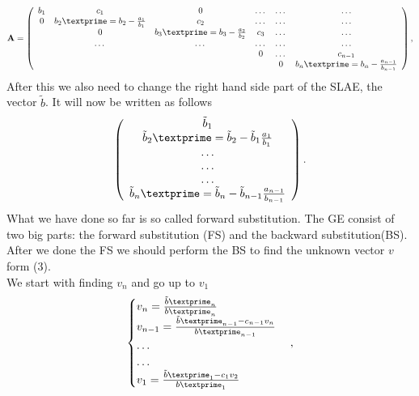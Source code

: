 \documentclass[10pt]{article}
\begin{document}
\begin{equation}
    {\bf A} = \left(\begin{array}{cccccc}
                             b_1& c_1 & 0 &\dots   & \dots &\dots \\
                           0 & {b_2}\textprime=b_2-\frac{a_1}{b_1} & c_2 &\dots &\dots &\dots \\
                           & 0 & {b_3}\textprime=b_3-\frac{a_2}{b_2} & c_3 & \dots & \dots \\
                           & \dots   & \dots &\dots   &\dots & \dots \\
                           &   &  &0  &\dots & c_{n-1} \\
                           &    &  &   &0 & {b_n}\textprime=b_{n}-\frac{a_{n-1}}{b_{n-1}} \\
                      \end{array} \right),
\end{equation}
After this we also need to change the right hand side part of the SLAE, the vector $ \tilde{b} $. It will now be written as follows
\begin{equation}
\left(\begin{array}{c}
                           \tilde{b}_1\\
                           {\tilde{b}_2}\textprime=\tilde{b}_2-\tilde{b}_1\frac{a_1}{b_1}\\
                           \dots \\
                           \dots \\
                          \dots \\
                           {\tilde{b}_n}\textprime=\tilde{b}_n - \tilde{b}_{n-1}\frac{a_{n-1}}{b_{n-1}}\\
                      \end{array} \right).
\end{equation}
What we have done so far is so called forward substitution. The GE consist of two big parts: the forward substitution (FS) and the backward substitution(BS). After we done the FS we should perform the BS to find the unknown vector $ v $ form (3). \\
We start with finding $ v_{n} $ and go up to $ v_{1} $
\begin{equation}
\begin{cases}
v_{n}=  \frac{{\tilde{b}\textprime_n}}{{b}\textprime_n}\\ 
v_{n-1}=  \frac{{\tilde{b}\textprime_{n-1}-c_{n-1}v_{n}}}{{b}\textprime_{n-1}}  \\ 
\dots   \\ 
\dots  \\ 
v_{1}= \frac{{\tilde{b}\textprime_{1}-c_{1}v_{2}}}{{b}\textprime_{1}} \\
\end{cases},
\end{equation}
\end{document}

